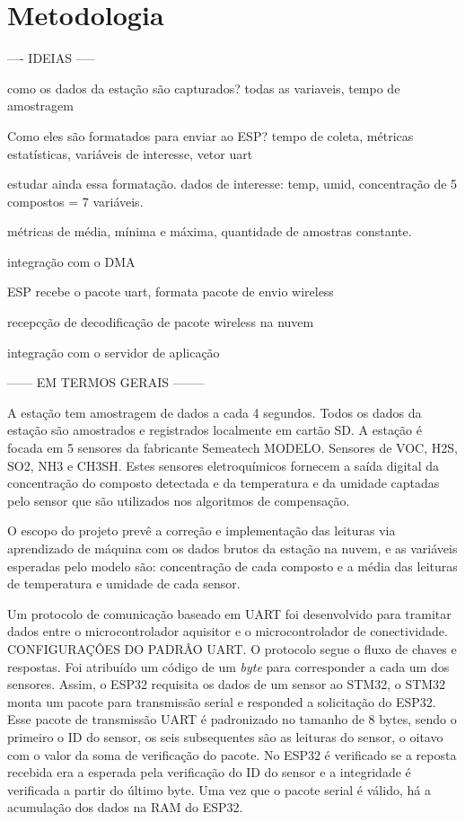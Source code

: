 
\section{Metodologia}\label{sec:proposed_solution}

---- IDEIAS -----

como os dados da estação são capturados? todas as variaveis, tempo de amostragem

Como eles são formatados para enviar ao ESP? tempo de coleta, métricas estatísticas, variáveis de interesse, vetor uart

estudar ainda essa formatação. dados de interesse: temp, umid, concentração de 5 compostos = 7 variáveis.

métricas de média, mínima e máxima, quantidade de amostras constante.

integração com o DMA

ESP recebe o pacote uart, formata pacote de envio wireless

recepcção de decodificação de pacote wireless na nuvem

integração com o servidor de aplicação

------ EM TERMOS GERAIS --------

A estação tem amostragem de dados a cada 4 segundos. Todos os dados da estação são amostrados e registrados localmente em cartão SD. A estação é focada em 5 sensores da fabricante Semeatech MODELO. Sensores de VOC, H2S, SO2, NH3 e CH3SH. Estes sensores eletroquímicos fornecem a saída digital da concentração do composto detectada e da temperatura e da umidade captadas pelo sensor que são utilizados nos algoritmos de compensação. 

O escopo do projeto prevê a correção e implementação das leituras via aprendizado de máquina com os dados brutos da estação na nuvem, e as variáveis esperadas pelo modelo são: concentração de cada composto e a média das leituras de temperatura e umidade de cada sensor.

Um protocolo de comunicação baseado em UART foi desenvolvido para tramitar dados entre o microcontrolador aquisitor e o microcontrolador de conectividade. CONFIGURAÇÔES DO PADRÂO UART. O protocolo segue o fluxo de chaves e respostas. Foi atribuído um código de um \textit{byte} para corresponder a cada um dos sensores. Assim, o ESP32 requisita os dados de um sensor ao STM32, o STM32 monta um pacote para transmissão serial e responded a solicitação do ESP32. Esse pacote de transmissão UART é padronizado no tamanho de 8 bytes, sendo o primeiro o ID do sensor, os seis subsequentes são as leituras do sensor, o oitavo com o valor da soma de verificação do pacote. No ESP32 é verificado se a reposta recebida era a esperada pela verificação do ID do sensor e a integridade é verificada a partir do último byte. Uma vez que o pacote serial é válido, há a acumulação dos dados na RAM do ESP32.

